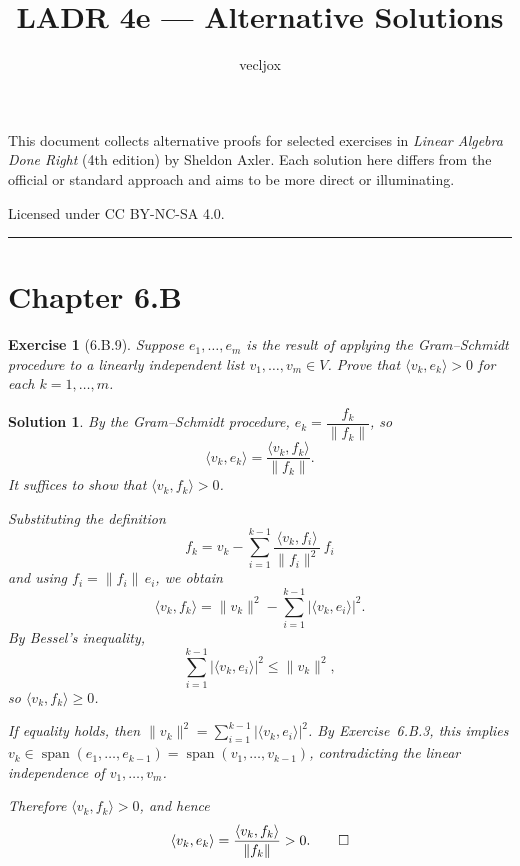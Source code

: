 \documentclass[11pt,a4paper]{article}
\title{\textbf{LADR 4e --- Alternative Solutions}}
\author{vecljox}
\date{}
\newtheorem*{exercise}{Exercise}
\newtheorem*{solution}{Solution}
\begin{document}
\maketitle

\noindent
This document collects alternative proofs for selected exercises in
\textit{Linear Algebra Done Right} (4th edition) by Sheldon Axler.
Each solution here differs from the official or standard approach
and aims to be more direct or illuminating.

\bigskip
\noindent
Licensed under CC BY-NC-SA 4.0.

\bigskip
\hrule
\vspace{1em}

\section*{Chapter 6.B}

\begin{exercise}[6.B.9]
Suppose $e_1, \dots, e_m$ is the result of applying the Gram--Schmidt
procedure to a linearly independent list $v_1, \dots, v_m \in V$.
Prove that $\langle v_k, e_k \rangle > 0$ for each $k = 1, \dots, m$.
\end{exercise}

\begin{solution}
By the Gram--Schmidt procedure, $e_k = \dfrac{f_k}{\|f_k\|}$, so
\[
    \langle v_k, e_k \rangle
    = \frac{\langle v_k, f_k \rangle}{\|f_k\|}.
\]
It suffices to show that $\langle v_k, f_k \rangle > 0$.

Substituting the definition
\[
    f_k = v_k - \sum_{i=1}^{k-1}
    \frac{\langle v_k, f_i \rangle}{\|f_i\|^2}\, f_i
\]
and using $f_i = \|f_i\|\, e_i$, we obtain
\[
    \langle v_k, f_k \rangle
    = \|v_k\|^2 - \sum_{i=1}^{k-1} |\langle v_k, e_i \rangle|^2.
\]
By Bessel's inequality,
\[
    \sum_{i=1}^{k-1} |\langle v_k, e_i \rangle|^2
    \leq \|v_k\|^2,
\]
so $\langle v_k, f_k \rangle \geq 0$.

If equality holds, then
$\|v_k\|^2 = \sum_{i=1}^{k-1} |\langle v_k, e_i \rangle|^2$.
By Exercise~6.B.3, this implies
$v_k \in \operatorname{span}(e_1, \dots, e_{k-1})
= \operatorname{span}(v_1, \dots, v_{k-1})$,
contradicting the linear independence of $v_1, \dots, v_m$.

Therefore $\langle v_k, f_k \rangle > 0$, and hence
\[
    \langle v_k, e_k \rangle
    = \frac{\langle v_k, f_k \rangle}{\|f_k\|} > 0.
    \qedhere
\]
\end{solution}
\end{document}
